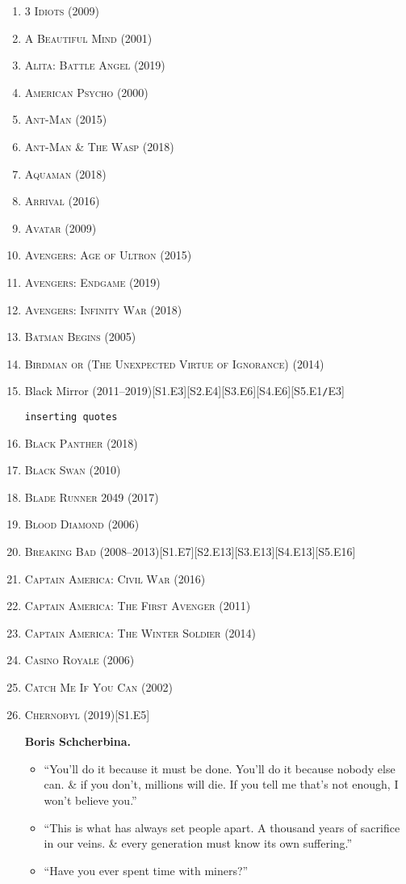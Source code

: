 \documentclass{article}
\numberwithin{equation}{section}
\begin{document}
\begin{enumerate}
	\item \textsc{3 Idiots} (2009)
	\item \textsc{A Beautiful Mind} (2001)
	\item \textsc{Alita: Battle Angel} (2019)
	\item \textsc{American Psycho} (2000)
	\item \textsc{Ant-Man} (2015)
	\item \textsc{Ant-Man \& The Wasp} (2018)
	\item \textsc{Aquaman} (2018)
	\item \textsc{Arrival} (2016)
	\item \textsc{Avatar} (2009)
	\item \textsc{Avengers: Age of Ultron} (2015)
	\item \textsc{Avengers: Endgame} (2019)
	\item \textsc{Avengers: Infinity War} (2018)
	\item \textsc{Batman Begins} (2005)
	\item \textsc{Birdman or (The Unexpected Virtue of Ignorance)} (2014)
	\item Black Mirror (2011--2019)\hfill[S1.E3][S2.E4][S3.E6][S4.E6][S5.E1\texttt{/}E3]
	
	\texttt{inserting quotes}
	\item \textsc{Black Panther} (2018)
	\item \textsc{Black Swan} (2010)
	\item \textsc{Blade Runner 2049} (2017)
	\item \textsc{Blood Diamond} (2006)
	\item \textsc{Breaking Bad} (2008--2013)\hfill[S1.E7][S2.E13][S3.E13][S4.E13][S5.E16]
	\item \textsc{Captain America: Civil War} (2016)
	\item \textsc{Captain America: The First Avenger} (2011)
	\item \textsc{Captain America: The Winter Soldier} (2014)
	\item \textsc{Casino Royale} (2006)
	\item \textsc{Catch Me If You Can} (2002)
	\item \textsc{Chernobyl} (2019)\hfill[S1.E5]
	
	\textbf{Boris Schcherbina.}
	\begin{itemize}
		\item ``You'll do it because it must be done. You'll do it because nobody else can. \& if you don't, millions will die. If you tell me that's not enough, I won't believe you.''
		\item ``This is what has always set people apart. A thousand years of sacrifice in our veins. \& every generation must know its own suffering.''
		\item ``Have you ever spent time with miners?''
		

\end{itemize}
\end{enumerate}
\end{document}
